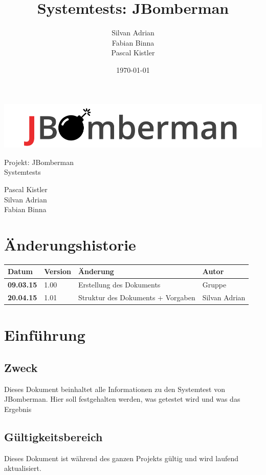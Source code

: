 \documentclass[11pt]{scrartcl}
\title{Systemtests: JBomberman}
\author{Silvan Adrian \\ Fabian Binna \\ Pascal Kistler}
\date{\today{}}
\begin{document}
\def\arraystretch{1.5}
\begin{titlepage}
\begin{center}
\vspace{10em}
\includegraphics[scale=2]{jbomberman}
\vspace{10em}
\end{center}
\begin{center}
\huge {Projekt: JBomberman} \\
\huge {Systemtests}
\end{center}
\begin{center}
\vspace{10em}
\LARGE {Pascal Kistler} \\
\LARGE {Silvan Adrian} \\
\LARGE {Fabian Binna}
\end{center}

\end{titlepage}

\newpage
\section{Änderungshistorie}
\label{sec:Änderungen}

\begin{tabularx}{\linewidth}{l l l l}
\textbf{Datum} & \textbf{Version} & \textbf{Änderung}  & \textbf{Autor} \\
\hline
\textbf{09.03.15} & 1.00 & Erstellung des Dokuments & Gruppe \\
\textbf{20.04.15} & 1.01 & Struktur des Dokuments + Vorgaben & Silvan Adrian \\
\end{tabularx}

\newpage
\tableofcontents
\newpage
\section{Einführung}
\subsection{Zweck}
Dieses Dokument beinhaltet alle Informationen zu den Systemtest von JBomberman.
Hier soll festgehalten werden, was getestet wird und was das Ergebnis
\subsection{Gültigkeitsbereich}
Dieses Dokument ist während des ganzen Projekts gültig und wird laufend aktualisiert.
\end{document}

